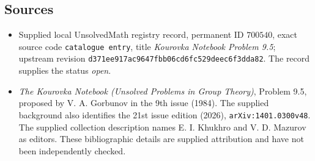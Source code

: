 \documentclass[11pt]{article}
\begin{document}
\subsection{Sources}
\begin{itemize}
\item Supplied local UnsolvedMath registry record, permanent ID \(700540\), exact source code \texttt{catalogue entry}, title \emph{Kourovka Notebook Problem 9.5}; upstream revision \texttt{d371ee917ac9647fbb06cd6fc529deec6f3dda82}. The record supplies the status \emph{open}.
\item \emph{The Kourovka Notebook (Unsolved Problems in Group Theory)}, Problem 9.5, proposed by V. A. Gorbunov in the 9th issue (1984). The supplied background also identifies the 21st issue edition (2026), \texttt{arXiv:1401.0300v48}. The supplied collection description names E. I. Khukhro and V. D. Mazurov as editors. These bibliographic details are supplied attribution and have not been independently checked.
\end{itemize}
\end{document}
